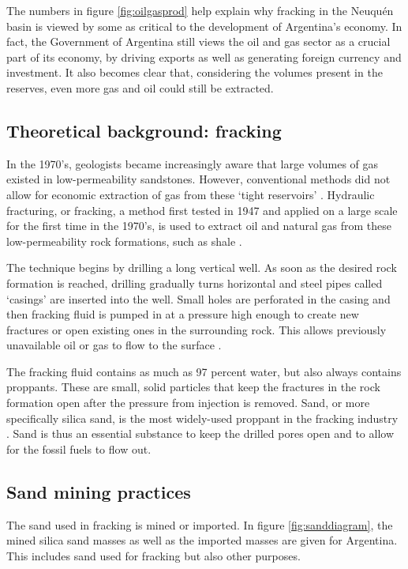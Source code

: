 The numbers in figure \ref{fig:oilgasprod} help explain why fracking in the Neuquén basin is viewed by some as critical to the development of Argentina's economy. In fact, the Government of Argentina still views the oil and gas sector as a crucial part of its economy, by driving exports as well as generating foreign currency and investment. It also becomes clear that, considering the volumes present in the reserves, even more gas and oil could still be extracted.

\subsection{Theoretical background: fracking}
In the 1970's, geologists became increasingly aware that large volumes of gas existed in low-permeability sandstones. However, conventional methods did not allow for economic extraction of gas from these `tight reservoirs' \autocite{lawGasTightReservoirs1992}. Hydraulic fracturing, or fracking, a method first tested in 1947 and applied on a large scale for the first time in the 1970's, is used to extract oil and natural gas from these low-permeability rock formations, such as shale \autocite{denchakFracking1012019}.

The technique begins by drilling a long vertical well. As soon as the desired rock formation is reached, drilling gradually turns horizontal and steel pipes called `casings' are inserted into the well. Small holes are perforated in the casing and then fracking fluid is pumped in at a pressure high enough to create new fractures or open existing ones in the surrounding rock. This allows previously unavailable oil or gas to flow to the surface \autocite{denchakFracking1012019}.

The fracking fluid contains as much as 97 percent water, but also always contains proppants. These are small, solid particles that keep the fractures in the rock formation open after the pressure from injection is removed. Sand, or more specifically silica sand, is the most widely-used proppant in the fracking industry \autocite{denchakFracking1012019}. Sand is thus an essential substance to keep the drilled pores open and to allow for the fossil fuels to flow out.

\subsection{Sand mining practices}
The sand used in fracking is mined or imported. In figure \ref{fig:sanddiagram}, the mined silica sand masses as well as the imported masses are given for Argentina. This includes sand used for fracking but also other purposes.

